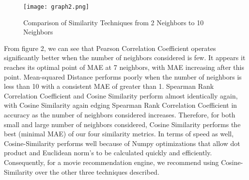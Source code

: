 \documentclass[11pt,letterpaper]{article}
\begin{document}
\begin{figure}[h]
\caption{Comparison of Similarity Techniques from 2 Neighbors to 10 Neighbors}
\texttt{[image: graph2.png]}
\centering
\end{figure}


From figure 2, we can see that Pearson Correlation Coefficient operates significantly better when the number of neighbors considered is few. It appears it reaches its optimal point of MAE at 7 neighbors, with MAE increasing after this point. Mean-squared Distance performs poorly when the number of neighbors is less than 10 with a consistent MAE of greater than 1. Spearman Rank Correlation Coefficient and Cosine Similarity perform almost identically again, with Cosine Similarity again edging Spearman Rank Correlation Coefficient in accuracy as the number of neighbors considered increases. Therefore, for both small and large number of neighbors considered, Cosine Similarity performs the best (minimal MAE) of our four similarity metrics. In terms of speed as well, Cosine-Similarity performs well because of Numpy optimizations that allow dot product and Euclidean norm's to be calculated quickly and efficiently. Consequently, for a movie recommendation engine, we recommend using Cosine-Similarity over the other three techniques described.
\end{document}
